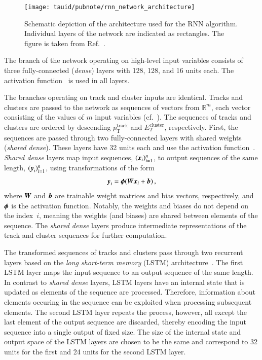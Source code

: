 \begin{figure}[htbp]
  \centering

  \texttt{[image: tauid/pubnote/rnn\_network\_architecture]}

  \caption{Schematic depiction of the architecture used for the RNN
    \tauid algorithm. Individual layers of the network are indicated
    as rectangles. The figure is taken from
    Ref.~\cite{ATL-PHYS-PUB-2019-033}.}%
  \label{fig:tauid_network_architecture}
\end{figure}

The branch of the network operating on high-level input variables
consists of three fully-connected (\emph{dense}) layers with 128, 128,
and 16 units each. The \ReLU activation function~\cite{nair:relu} is
used in all layers.

The branches operating on track and cluster inputs are
identical. Tracks and clusters are passed to the network as sequences
of vectors from $\mathbb{R}^m$, each vector consisting of the values
of $m$ input variables (cf.~). The
sequences of tracks and clusters are ordered by descending
$p_{\text{T}}^{\text{track}}$ and $E_{T}^{\text{cluster}}$,
respectively. First, the sequences are passed through two
fully-connected layers with shared weights (\emph{shared dense}).
These layers have 32 units each and use the \ReLU activation
function~\cite{nair:relu}. \emph{Shared dense} layers map input
sequences, $(\myvec{x}_i)_{i=1}^{n}$, to output sequences of the same
length, $(\myvec{y}_i)_{i=1}^{n}$, using transformations of the form
\begin{align*}
  \myvec{y}_i = \myvec{\phi}(\myvec{W} \myvec{x}_i + \myvec{b}) \,\text{,}
\end{align*}
where $\myvec{W}$ and $\myvec{b}$ are trainable weight matrices and
bias vectors, respectively, and $\myvec{\phi}$ is the activation
function.  Notably, the weights and biases do not depend on the
index~$i$, meaning the weights (and biases) are shared between
elements of the sequence. The \emph{shared dense} layers produce
intermediate representations of the track and cluster sequences for
further computation.

The transformed sequences of tracks and clusters pass through two
recurrent layers based on the \emph{long short-term memory} (LSTM)
architecture~\cite{lstm}. The first LSTM layer maps the input sequence
to an output sequence of the same length. In contrast to \emph{shared
  dense} layers, LSTM layers have an internal state that is updated as
elements of the sequence are processed. Therefore, information about
elements occuring in the sequence can be exploited when processing
subsequent elements. The second LSTM layer repeats the process,
however, all except the last element of the output sequence are
discarded, thereby encoding the input sequence into a single output of
fixed size. The size of the internal state and output space of the
LSTM layers are chosen to be the same and correspond to 32 units for
the first and 24 units for the second LSTM layer.

